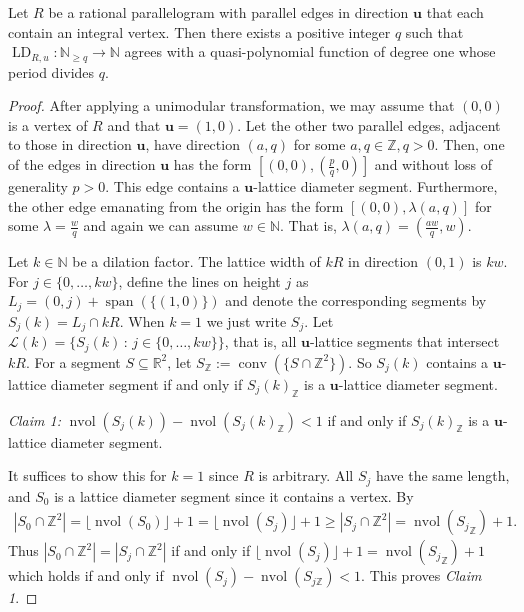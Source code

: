 \documentclass[11pt]{article}
\newcommand{\bu}{\mathbf{u}}
\newcommand{\R}{\mathbb{R}}
\newcommand{\Z}{\mathbb{Z}}
\newcommand{\N}{\mathbb{N}}
\newcommand{\Lcal}{\mathcal{L}}
\DeclareMathOperator{\conv}{conv}
\DeclareMathOperator{\spn}{span}
\DeclareMathOperator{\nvol}{nvol}
\DeclareMathOperator{\LD}{LD}
\newcommand{\st}{\, \mathrm{:}\,}
\begin{document}
\begin{proposition}\label{prop:QP-in-parallelotope}
    Let $R$ be a rational parallelogram with parallel edges in direction $\bu$ that each contain an integral vertex. Then there exists a positive integer $q$ such that \mbox{$\LD_{R,u}:\N_{\geq q} \to \N$} agrees with a quasi-polynomial function of degree one whose period divides $q$.
\end{proposition}
\begin{proof}
    After applying a unimodular transformation, we may assume that $(0,0)$ is a vertex of $R$ and that $\bu = (1,0)$. Let the other two parallel edges, adjacent to those in direction $\bu$, have direction $(a,q)$ for some $a,q \in \Z, q >0$. Then, one of the edges in direction $\bu$ has the form $[(0,0),(\frac{p}{q},0)]$ and without loss of generality $p>0$. This edge contains a $\bu$-lattice diameter segment. Furthermore, the other edge emanating from the origin has the form $[(0,0),\lambda(a,q)]$ for some $\lambda = \frac{w}{q}$ and again we can assume $w \in \N$. That is, $\lambda(a,q) = (\frac{aw}{q},w)$.
    
    Let $k \in \N$ be a dilation factor. The lattice width of $kR$ in direction $(0,1)$ is $kw$.
    For $j \in \{0, \ldots, kw\}$, define the lines on height $j$ as $L_j = (0,j) + \spn(\{(1,0)\})$ and denote the corresponding segments by $S_j(k) = L_j \cap kR$. When $k=1$ we just write $S_j$. Let $\Lcal(k) = \{S_j(k) \st j \in \{0, \ldots, kw\}\}$, that is, all $\bu$-lattice segments that intersect $kR$. For a segment $S \subseteq \R^2$, let $S_{{\Z}} := \conv (\{S \cap \Z^2\})$. So $S_j(k)$ contains a $\bu$-lattice diameter segment if and only if $S_j(k)_{\Z}$ is a $\bu$-lattice diameter segment.

    \emph{Claim 1:} $\nvol(S_j(k))-\nvol(S_{j}(k)_{\Z}) <1$ if and only if $S_{j}(k)_\Z$ is a $\bu$-lattice diameter segment.
    
    It suffices to show this for $k=1$ since $R$ is arbitrary. All $S_j$ have the same length, and $S_0$ is a lattice diameter segment since it contains a vertex. By 
    \begin{align*}
        |S_0 \cap \Z^2| = \lfloor \nvol(S_0) \rfloor +1 
        = \lfloor \nvol(S_j) \rfloor +1  \geq |S_j \cap \Z^2| = \nvol({S_{j}}_{\Z}) +1.
    \end{align*}
    Thus $|S_0 \cap \Z^2| = |S_j \cap \Z^2|$ if and only if $\lfloor \nvol(S_j) \rfloor +1  = \nvol({S_{j}}_{\Z}) +1$ which holds if and only if $\nvol(S_j)- \nvol(S_{j{\Z}}) < 1$. This proves \textit{Claim 1}.



\end{proof}
\end{document}

